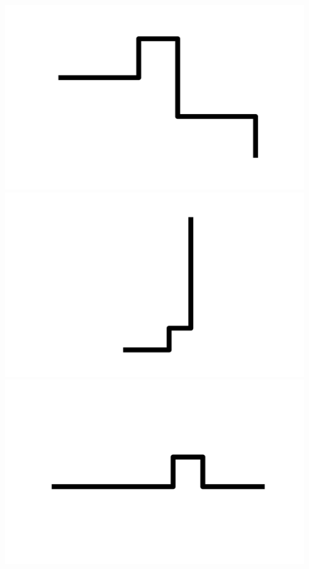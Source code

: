 \documentclass[]{report}
\begin{document}
\includegraphics[scale=.1]{pictures/21/state_cluster_shapes_130.pdf} 
\includegraphics[scale=.1]{pictures/21/state_cluster_shapes_131.pdf} 
\includegraphics[scale=.1]{pictures/21/state_cluster_shapes_132.pdf} 
\end{document}
